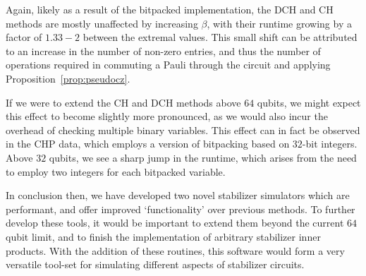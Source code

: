 Again, likely as a result of the bitpacked implementation, the DCH and CH methods are mostly unaffected by increasing $\beta$, with their runtime growing by a factor of $1.33-2$ between the extremal values. This small shift can be attributed to an increase in the number of non-zero entries, and thus the number of operations required in commuting a Pauli through the circuit and applying Proposition~\ref{prop:pseudocz}.\par
If we were to extend the CH and DCH methods above $64$ qubits, we might expect this effect to become slightly more pronounced, as we would also incur the overhead of checking multiple binary variables. This effect can in fact be observed in the CHP data, which employs a version of bitpacking based on $32$-bit integers. Above $32$ qubits, we see a sharp jump in the runtime, which arises from the need to employ two integers for each bitpacked variable.\par
In conclusion then, we have developed two novel stabilizer simulators which are performant, and offer improved `functionality' over previous methods. To further develop these tools, it would be important to extend them beyond the current $64$ qubit limit, and to finish the implementation of arbitrary stabilizer inner products. With the addition of these routines, this software would form a very versatile tool-set for simulating different aspects of stabilizer circuits.